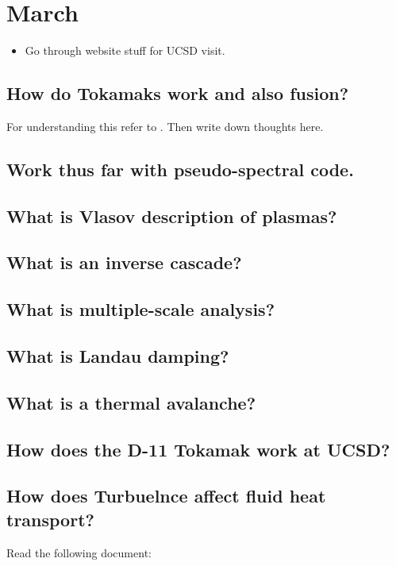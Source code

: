 \section{March}

\begin{itemize}
	\item Go through website stuff for UCSD visit. 
\end{itemize}

\subsection{How do Tokamaks work and also fusion?}
For understanding this refer to \cite{dini2009overview}. Then write down thoughts here.

\subsection{Work thus far with pseudo-spectral code.}

\subsection{What is Vlasov description of plasmas?}

\subsection{What is an inverse cascade?}

\subsection{What is multiple-scale analysis?}

\subsection{What is Landau damping?}

\subsection{What is a thermal avalanche?}

\subsection{How does the D-11 Tokamak work at UCSD?}

\subsection{How does Turbuelnce affect fluid heat transport?}
Read the following document: \cite{1992ApJ...388...64W}
